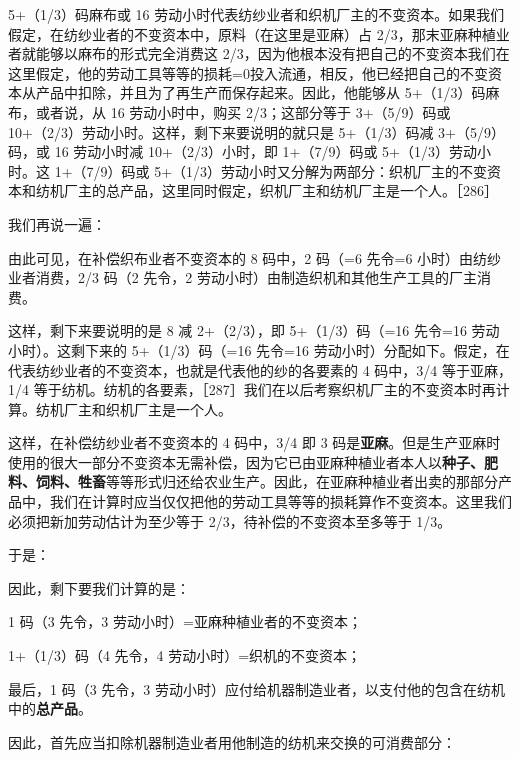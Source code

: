 5+（1/3）码麻布或 16 劳动小时代表纺纱业者和织机厂主的不变资本。如果我们假定，在纺纱业者的不变资本中，原料（在这里是亚麻）占 2/3，那末亚麻种植业者就能够以麻布的形式完全消费这 2/3，因为他根本没有把自己的不变资本\fontbox{~\{}我们在这里假定，他的劳动工具等等的损耗=0\fontbox{\}~}投入流通，相反，他已经把自己的不变资本从产品中扣除，并且为了再生产而保存起来。因此，他能够从 5+（1/3）码麻布，或者说，从 16 劳动小时中，购买 2/3；这部分等于 3+（5/9）码或 10+（2/3）劳动小时。这样，剩下来要说明的就只是 5+（1/3）码减 3+（5/9）码，或 16 劳动小时减 10+（2/3）小时，即 1+（7/9）码或 5+（1/3）劳动小时。这 1+（7/9）码或 5+（1/3）劳动小时又分解为两部分：织机厂主的不变资本和纺机厂主的总产品，这里同时假定，织机厂主和纺机厂主是一个人。［286］

我们再说一遍：

\todo{}

由此可见，在补偿织布业者不变资本的 8 码中，2 码（=6 先令=6 小时）由纺纱业者消费，2/3 码（2 先令，2 劳动小时）由制造织机和其他生产工具的厂主消费。

这样，剩下来要说明的是 8 减 2+（2/3），即 5+（1/3）码（=16 先令=16 劳动小时）。这剩下来的 5+（1/3）码（=16 先令=16 劳动小时）分配如下。假定，在代表纺纱业者的不变资本，也就是代表他的纱的各要素的 4 码中，3/4 等于亚麻，1/4 等于纺机。纺机的各要素，［287］我们在以后考察织机厂主的不变资本时再计算。纺机厂主和织机厂主是一个人。

这样，在补偿纺纱业者不变资本的 4 码中，3/4 即 3 码是\textbf{亚麻}。但是生产亚麻时使用的很大一部分不变资本无需补偿，因为它已由亚麻种植业者本人以\textbf{种子、肥料、饲料、牲畜}等等形式归还给农业生产。因此，在亚麻种植业者出卖的那部分产品中，我们在计算时应当仅仅把他的劳动工具等等的损耗算作不变资本。这里我们必须把新加劳动估计为至少等于 2/3，待补偿的不变资本至多等于 1/3。

于是：

\todo{}

因此，剩下要我们计算的是：

1 码（3 先令，3 劳动小时）=亚麻种植业者的不变资本；

1+（1/3）码（4 先令，4 劳动小时）=织机的不变资本；

最后，1 码（3 先令，3 劳动小时）应付给机器制造业者，以支付他的包含在纺机中的\textbf{总产品}。

因此，首先应当扣除机器制造业者用他制造的纺机来交换的可消费部分：

